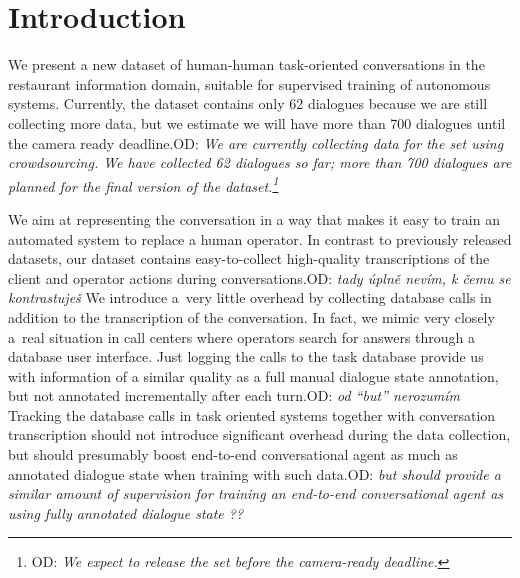 \documentclass[runningheads,a4paper]{llncs}
\def\OP#1{#1}  %
\def\OD#1{{\color{darkgreen}OD: \it #1}}
\begin{document}
\vspace{-1.00em}
\vspace{-1.00em}

\section{Introduction}\label{sec:intro}
\vspace{-0.50em}
We present a new dataset of human-human task-oriented conversations in the restaurant information domain, suitable for supervised training of autonomous systems. 
Currently, the dataset contains only \OP{62} dialogues because we are still collecting more data, but we estimate we will have more than 700 dialogues until the camera ready deadline.\OD{We are currently collecting data for the set using crowdsourcing. We have collected 62 dialogues so far; more than 700 dialogues are planned for the final version of the dataset.\footnote{\OD{We expect to release the set before the camera-ready deadline.}}}

We aim at representing the conversation in a way that makes it easy to train an automated system to replace a human operator. 
In contrast to previously released datasets, our dataset contains easy-to-collect high-quality transcriptions of the client and operator actions during conversations.\OD{tady úplně nevím, k čemu se kontrastuješ}
We introduce a~very little overhead by collecting database calls in addition to the transcription of the conversation.
In fact, we mimic very closely a~real situation in call centers where operators search for answers through a database user interface. 
Just logging the calls to the task database provide us with information of a similar quality as a full manual dialogue state annotation, but not annotated incrementally after each turn.\OD{od “but” nerozumím}
Tracking the database calls in task oriented systems together with conversation transcription should not introduce significant overhead during the data collection, but should presumably boost end-to-end conversational agent as much as annotated dialogue state when training with such data.\OD{but should provide a similar amount of supervision for training an end-to-end conversational agent as using fully annotated dialogue state ??}
\end{document}
